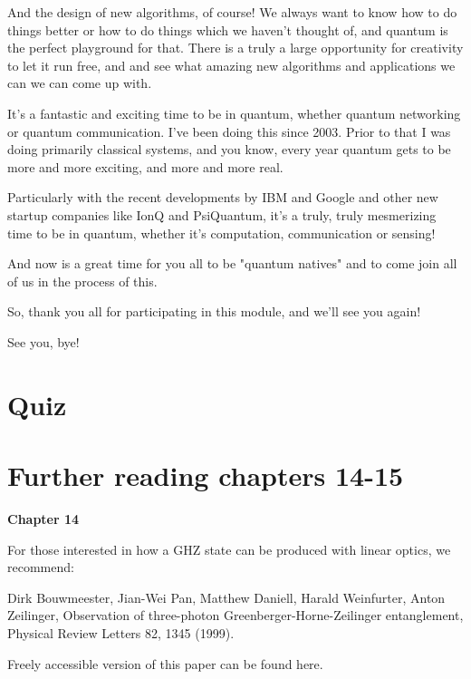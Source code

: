 And the design of new algorithms, of course! We always want to know how to do things better or how to do things which we haven't thought of, and quantum is the perfect playground for that. There is a truly a large opportunity for creativity to let it run free, and and see what amazing new algorithms and applications we can we can come up with.

\rrr It's a fantastic and exciting time to be in quantum, whether quantum networking or quantum communication. I've been doing this since 2003. Prior to that I was doing primarily classical systems, and you know, every year quantum gets to be more and more exciting, and more and more real.

\mmm Particularly with the recent developments by IBM and Google and other new startup companies like IonQ and PsiQuantum, it's a truly, truly mesmerizing time to be in quantum, whether it's computation, communication or sensing!

\rrr And now is a great time for you all to be "quantum natives" and to come join all of us in the process of this.

So, thank you all for participating in this module, and we'll see you again!

\mmm See you, bye!



\newpage
\section*{Quiz}


\section*{Further reading chapters 14-15}

{\bf Chapter 14}

For those interested in how a GHZ state can be produced with linear optics, we recommend:

Dirk Bouwmeester, Jian-Wei Pan, Matthew Daniell, Harald Weinfurter, Anton Zeilinger, Observation of three-photon Greenberger-Horne-Zeilinger entanglement, Physical Review Letters 82, 1345 (1999).

Freely accessible version of this paper can be found here.

